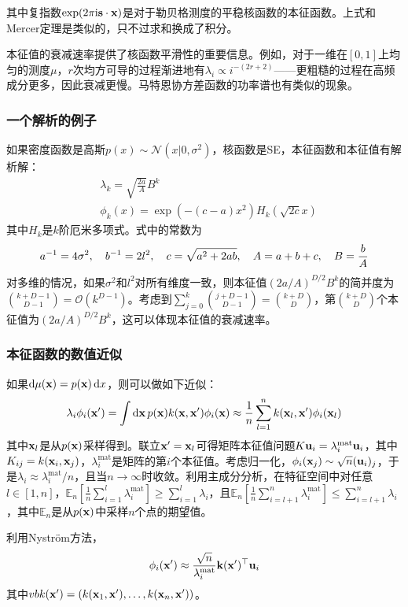 \documentclass[12pt,UTF8]{article}
\begin{document}
            其中复指数$\exp(2\pi\mathrm{i}\vb{s}\cdot\vb{x})$是对于勒贝格测度的平稳核函数的本征函数。上式和Mercer定理是类似的，只不过求和换成了积分。\par
            本征值的衰减速率提供了核函数平滑性的重要信息。例如，对于一维在$[0,1]$上均匀的测度$\mu$，$r$次均方可导的过程渐进地有$\lambda_i\propto i^{-(2r+2)}$——更粗糙的过程在高频成分更多，因此衰减更慢。马特恩协方差函数的功率谱也有类似的现象。
            \subsubsection{一个解析的例子}
                如果密度函数是高斯$p(x)\sim\mathcal{N}(x|0,\sigma^2)$，核函数是SE，本征函数和本征值有解析解：
                \begin{align}
                    &\lambda_{k}=\sqrt{\frac{2a}{A}}B^k \\
                    &\phi_k(x)=\exp(-(c-a)x^2)H_k(\sqrt{2c}x)
                \end{align}
                其中$H_k$是$k$阶厄米多项式。式中的常数为
                \begin{equation}
                    a^{-1}=4\sigma^2\qc b^{-1}=2l^2\qc c=\sqrt{a^2+2ab}\qc A=a+b+c\qc B=\frac{b}{A}
                \end{equation}
                对多维的情况，如果$\sigma^2$和$l^2$对所有维度一致，则本征值$(2a/A)^{D/2}B^k$的简并度为$\binom{k+D-1}{D-1}=\mathcal{O}(k^{D-1})$。考虑到$\sum_{j=0}^k{\binom{j+D-1}{D-1}}=\binom{k+D}{D}$，第$\binom{k+D}{D}$个本征值为$(2a/A)^{D/2}B^k$，这可以体现本征值的衰减速率。
            \subsubsection{本征函数的数值近似}
                如果$\dd{\mu(\vb{x})}=p(\vb{x})\dd{x}$，则可以做如下近似：
                \begin{equation}
                    \lambda_i\phi_i(\vb{x}')=\int{\dd{\vb{x}}p(\vb{x})k(\vb{x},\vb{x}')\phi_i(\vb{x})}\approx\frac{1}{n}\sum_{l=1}^n{k(\vb{x}_l,\vb{x}')\phi_i(\vb{x}_l)}
                \end{equation}
                其中$\vb{x}_l$是从$p(\vb{x})$采样得到。联立$\vb{x}'=\vb{x}_l$可得矩阵本征值问题$K\vb{u}_i=\lambda_i^{\mathrm{mat}}\vb{u}_i$，其中$K_{ij}=k(\vb{x}_i,\vb{x}_j)$，$\lambda_i^{\mathrm{mat}}$是矩阵的第$i$个本征值。考虑归一化，$\phi_i(\vb{x}_j)\sim\sqrt{n}(\vb{u}_i)_j$，于是$\lambda_i\approx\lambda_i^{\mathrm{mat}}/n$，且当$n\rightarrow\infty$时收敛。利用主成分分析，在特征空间中对任意$l\in[1,n]$，$\mathbb{E}_n[\frac{1}{n}\sum_{i=1}^l{\lambda_i^{\mathrm{mat}}}]\geqslant\sum_{i=1}^l{\lambda_i}$，且$\mathbb{E}_n[\frac{1}{n}\sum_{i=l+1}^n{\lambda_i^{\mathrm{mat}}}]\leqslant\sum_{i=l+1}^n{\lambda_i}$，其中$\mathbb{E}_n$是从$p(\vb{x})$中采样$n$个点的期望值。\par
                利用Nystr\"om方法，
                \begin{equation}
                    \phi_i(\vb{x}')\approx\frac{\sqrt{n}}{\lambda_i^{\mathrm{mat}}}\vb{k}(\vb{x}')^\top\vb{u}_i
                \end{equation}
                其中$vb{k}(\vb{x}')=(k(\vb{x}_1,\vb{x}'),\dots,k(\vb{x}_n,\vb{x}'))$。\par
\end{document}

